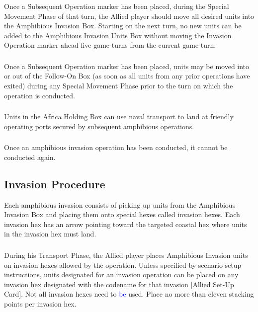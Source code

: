 \subsubsection{} Once a Subsequent Operation marker has been placed, during the Special Movement Phase of that turn, the Allied player should move all desired units into the Amphibious Invasion Box. Starting on the next turn, no new units can be added to the Amphibious Invasion Units Box without moving the Invasion Operation marker ahead five game-turns from the current game-turn.

\subsubsection{} Once a Subsequent Operation marker has been placed, units may be moved into or out of the Follow-On Box (as soon as all units from any prior operations have exited) during any Special Movement Phase prior to the turn on which the operation is conducted.

\subsubsection{} Units in the Africa Holding Box can use naval transport to land at friendly operating ports secured by subsequent amphibious operations.

\subsubsection{} Once an amphibious invasion operation has been conducted, it cannot be conducted again.

\subsection{Invasion Procedure}

Each amphibious invasion consists of picking up units from the Amphibious Invasion Box and placing them onto special hexes called invasion hexes. Each invasion hex has an arrow pointing toward the targeted coastal hex where units in the invasion hex must land.

\subsubsection{} During his Transport Phase, the Allied player places Amphibious Invasion units on invasion hexes allowed by the operation. Unless specified by scenario setup instructions, units designated for an invasion operation can be placed on any invasion hex designated with the codename for that invasion [Allied Set-Up Card]. Not all invasion hexes need to \textcolor{blue}{be} used. Place no more than eleven stacking points per invasion hex.

